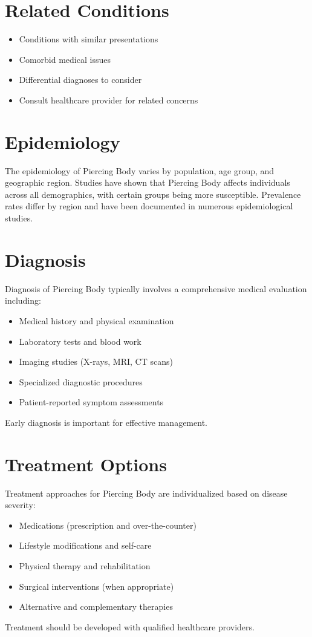 \section*{Related Conditions}
\begin{itemize}
  \item Conditions with similar presentations
  \item Comorbid medical issues
  \item Differential diagnoses to consider
  \item Consult healthcare provider for related concerns
\end{itemize}

\section*{Epidemiology}
The epidemiology of Piercing Body varies by population, age group, and geographic region. Studies have shown that Piercing Body affects individuals across all demographics, with certain groups being more susceptible. Prevalence rates differ by region and have been documented in numerous epidemiological studies.

\section*{Diagnosis}
Diagnosis of Piercing Body typically involves a comprehensive medical evaluation including:
\begin{itemize}
  \item Medical history and physical examination
  \item Laboratory tests and blood work
  \item Imaging studies (X-rays, MRI, CT scans)
  \item Specialized diagnostic procedures
  \item Patient-reported symptom assessments
\end{itemize}
Early diagnosis is important for effective management.

\section*{Treatment Options}
Treatment approaches for Piercing Body are individualized based on disease severity:
\begin{itemize}
  \item Medications (prescription and over-the-counter)
  \item Lifestyle modifications and self-care
  \item Physical therapy and rehabilitation
  \item Surgical interventions (when appropriate)
  \item Alternative and complementary therapies
\end{itemize}
Treatment should be developed with qualified healthcare providers.

